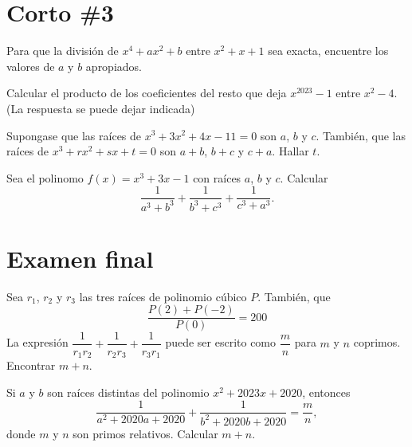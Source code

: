 \section{Corto \#3}

    \begin{section-problem}
        Para que la división de $x^4 + ax^2 + b$ entre $x^2 + x + 1$ sea exacta, encuentre los valores de $a$ y $b$ apropiados.
    \end{section-problem}

    \begin{section-problem}
        Calcular el producto de los coeficientes del resto que deja $x^{2023} - 1$ entre $x^2 - 4$. (La respuesta se puede dejar indicada)
    \end{section-problem}

    \begin{section-problem}
        Supongase que las raíces de $x^3 + 3x^2 + 4x - 11 = 0$ son $a$, $b$ y $c$.
        También, que las raíces de $x^3 + rx^2 + sx + t = 0$ son $a + b$, $b + c$ y $c + a$.
        Hallar $t$.
    \end{section-problem}

    \begin{section-problem}
        Sea el polinomo $f(x) = x^3 + 3x - 1$ con raíces $a$, $b$ y $c$.
        Calcular
        \[\frac{1}{a^3 + b^3} + \frac{1}{b^3 + c^3} + \frac{1}{c^3 + a^3}.\]
    \end{section-problem}

\section{Examen final}
    
    \begin{section-problem}
        Sea $r_1$, $r_2$ y $r_3$ las tres raíces de polinomio cúbico $P$.
        También, que
        \[\frac{P(2) + P(-2)}{P(0)} = 200\]
        La expresión $\dfrac{1}{r_1 r_2} + \dfrac{1}{r_2 r_3} + \dfrac{1}{r_3 r_1}$ puede ser escrito como $\dfrac{m}{n}$ para $m$ y $n$ coprimos.
        Encontrar $m + n$.
    \end{section-problem}

    \begin{section-problem}
        Si $a$ y $b$ son raíces distintas del polinomio $x^2 + 2023x + 2020$, entonces
        \[\frac{1}{a^2 + 2020a + 2020} + \frac{1}{b^2 + 2020b + 2020} = \frac{m}{n},\]
        donde $m$ y $n$ son primos relativos.
        Calcular $m + n$.
    \end{section-problem}
